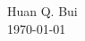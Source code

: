 \documentclass[12pt]{article}
\begin{document}
\noindent Huan Q. Bui\\
\today


%	
%	 

	

















	
	
	
	
	
\end{document}
